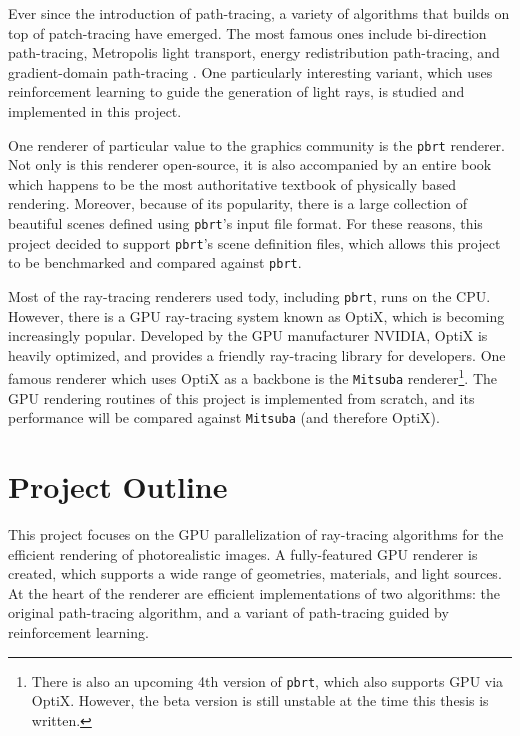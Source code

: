 Ever since the introduction of path-tracing, a variety of algorithms that builds on top of patch-tracing have emerged. The most famous ones include bi-direction path-tracing\cite{veach1997robust}, Metropolis light transport\cite{veach1997robust}\cite{kelemen2002simple}, energy redistribution path-tracing\cite{cline2005energy}, and gradient-domain path-tracing \cite{kettunen2015gradient}. One particularly interesting variant, which uses reinforcement learning to guide the generation of light rays\cite{RLPT}, is studied and implemented in this project. 

One renderer of particular value to the graphics community is the \texttt{pbrt} renderer. Not only is this renderer open-source, it is also accompanied by an entire book\cite{pharr2016physically} which happens to be the most authoritative textbook of physically based rendering. Moreover, because of its popularity, there is a large collection of beautiful scenes defined using \texttt{pbrt}'s input file format. For these reasons, this project decided to support \texttt{pbrt}'s scene definition files, which allows this project to be benchmarked and compared against \texttt{pbrt}.

Most of the ray-tracing renderers used tody, including \texttt{pbrt}, runs on the CPU. However, there is a GPU ray-tracing system known as OptiX\cite{parker2010optix}, which is becoming increasingly popular. Developed by the GPU manufacturer NVIDIA, OptiX is heavily optimized, and provides a friendly ray-tracing library for developers. One famous renderer which uses OptiX as a backbone is the \texttt{Mitsuba} renderer\footnote{There is also an upcoming 4th version of \texttt{pbrt}, which also supports GPU via OptiX. However, the beta version is still unstable at the time this thesis is written.}. The GPU rendering routines of this project is implemented from scratch, and its performance will be compared against \texttt{Mitsuba} (and therefore OptiX).

\section{Project Outline}
This project focuses on the GPU parallelization of ray-tracing algorithms for the efficient rendering of photorealistic images. A fully-featured GPU renderer is created, which supports a wide range of geometries, materials, and light sources. At the heart of the renderer are efficient implementations of two algorithms: the original path-tracing algorithm, and a variant of path-tracing guided by reinforcement learning. 

